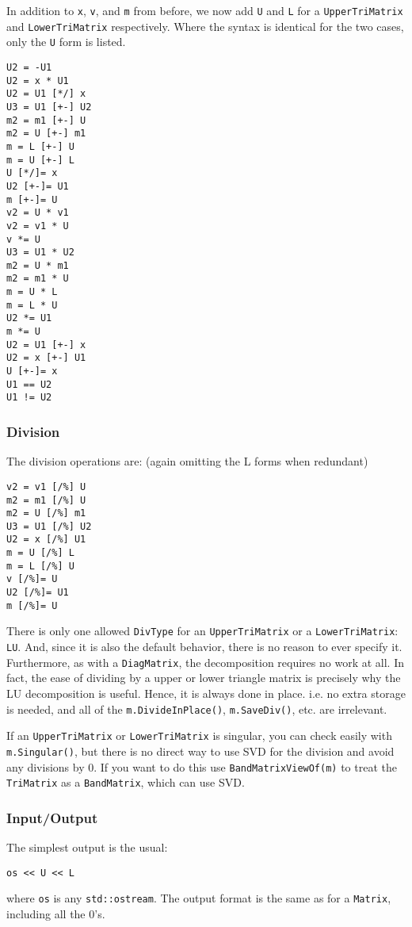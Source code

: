 \documentclass[twoside,letterpaper,11pt]{article}
\renewcommand{\tt}[1]{{\texttt {#1}}}
\begin{document}
In addition to \tt{x}, \tt{v}, and \tt{m} from before, 
we now add \tt{U} and \tt{L} for a \tt{UpperTriMatrix}
and \tt{LowerTriMatrix} respectively.  Where the syntax is identical
for the two cases, only the \tt{U} form is listed.

\begin{verbatim}
U2 = -U1
U2 = x * U1
U2 = U1 [*/] x
U3 = U1 [+-] U2
m2 = m1 [+-] U
m2 = U [+-] m1
m = L [+-] U
m = U [+-] L
U [*/]= x
U2 [+-]= U1
m [+-]= U
v2 = U * v1
v2 = v1 * U
v *= U
U3 = U1 * U2
m2 = U * m1
m2 = m1 * U
m = U * L
m = L * U
U2 *= U1
m *= U
U2 = U1 [+-] x
U2 = x [+-] U1
U [+-]= x
U1 == U2
U1 != U2
\end{verbatim}

\subsubsection{Division}

The division operations are: (again omitting the L forms when redundant)
\begin{verbatim}
v2 = v1 [/%] U
m2 = m1 [/%] U
m2 = U [/%] m1
U3 = U1 [/%] U2
U2 = x [/%] U1
m = U [/%] L
m = L [/%] U
v [/%]= U
U2 [/%]= U1
m [/%]= U
\end{verbatim}

There is only one allowed \tt{DivType} for an \tt{UpperTriMatrix} or a 
\tt{LowerTriMatrix}: \tt{LU}.
And, since it is also the default behavior,
there is no reason to ever specify it.
Furthermore, as with a \tt{DiagMatrix},
the decomposition requires no work at all.  In fact, the ease of dividing by a 
upper or lower triangle matrix is precisely why the LU decomposition is useful.
Hence, it is always done in place.  i.e. no extra storage is needed, and all of
the \tt{m.DivideInPlace()}, \tt{m.SaveDiv()}, etc. are irrelevant.

If an \tt{UpperTriMatrix} or \tt{LowerTriMatrix} is singular, 
you can check easily with \tt{m.Singular()},
but there is no direct way to use SVD for the division and avoid any
divisions by 0.  If you want to do this use \tt{BandMatrixViewOf(m)} to 
treat the \tt{TriMatrix} as a \tt{BandMatrix}, which can use SVD.

\subsubsection{Input/Output}

The simplest output is the usual:
\begin{verbatim}
os << U << L
\end{verbatim}
where \tt{os} is any \tt{std::ostream}.
The output format is the same as for a \tt{Matrix}, including all the 0's.
\end{document}
